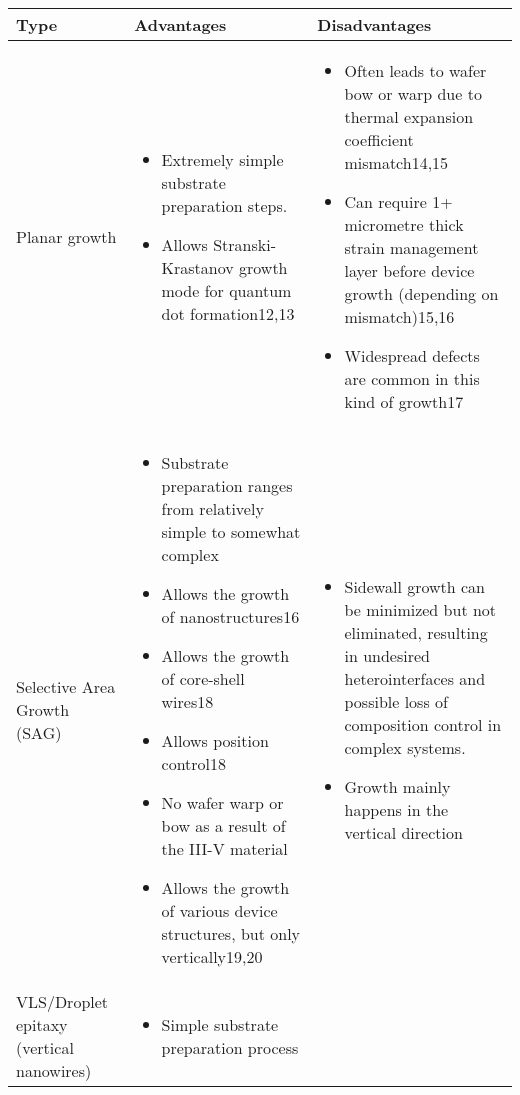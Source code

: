 \begin{sidewaystable}
    \centering
\begin{longtable}{p{}|p{}|p{}}
    Type & Advantages & Disadvantages \\ \hline \hline
    Planar growth & 
    \begin{itemize}
        \item Extremely simple substrate preparation steps.
        \item Allows Stranski-Krastanov growth mode for quantum dot formation12,13
    \end{itemize} & 
    \begin{itemize}
        \item Often leads to wafer bow or warp due to thermal expansion coefficient mismatch14,15
        \item Can require 1+ micrometre thick strain management layer before device growth (depending on mismatch)15,16
        \item Widespread defects are common in this kind of growth17
    \end{itemize} \\ \hline
    Selective Area Growth (SAG) & 
    \begin{itemize}
        \item Substrate preparation ranges from relatively simple to somewhat complex
        \item Allows the growth of nanostructures16
        \item Allows the growth of core-shell wires18
        \item Allows position control18
        \item No wafer warp or bow as a result of the III-V material
        \item Allows the growth of various device structures, but only vertically19,20
    \end{itemize}  & 
    \begin{itemize}
        \item Sidewall growth can be minimized but not  eliminated, resulting in undesired heterointerfaces and possible loss of composition control in complex systems.
        \item Growth mainly happens in the vertical direction
    \end{itemize}  \\ \hline
    VLS/Droplet epitaxy (vertical nanowires) & 
    \begin{itemize}
        \item Simple substrate preparation process

\end{itemize}
\end{longtable}
\end{sidewaystable}

